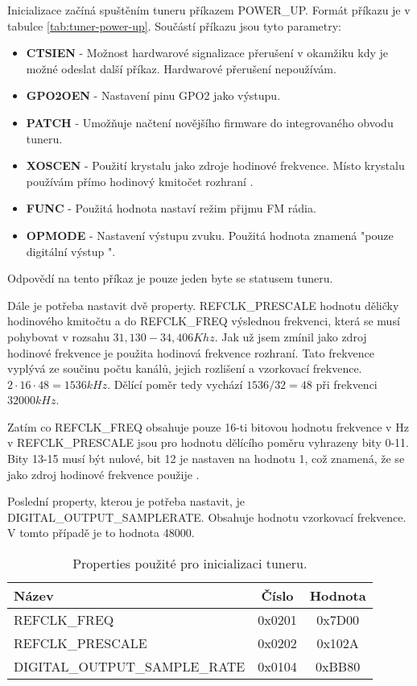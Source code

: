 Inicializace začíná spuštěním tuneru příkazem POWER\_UP. Formát příkazu je v tabulce \ref{tab:tuner-power-up}. Součástí příkazu jsou tyto parametry:

\begin{itemize}
\item \textbf{CTSIEN} - Možnost hardwarové signalizace přerušení v okamžiku kdy je možné odeslat další příkaz. Hardwarové přerušení nepoužívám.
\item \textbf{GPO2OEN} - Nastavení pinu GPO2 jako výstupu.
\item \textbf{PATCH} - Umožňuje načtení novějšího firmware do integrovaného obvodu tuneru.
\item \textbf{XOSCEN} - Použití krystalu jako zdroje hodinové frekvence. Místo krystalu používám přímo hodinový kmitočet rozhraní \iis.
\item \textbf{FUNC} - Použitá hodnota nastaví režim přijmu FM rádia.
\item \textbf{OPMODE} - Nastavení výstupu zvuku. Použitá hodnota znamená "pouze digitální výstup \iis".
\end{itemize}

Odpovědí na tento příkaz je pouze jeden byte se statusem tuneru.

Dále je potřeba nastavit dvě property. REFCLK\_PRESCALE hodnotu děličky hodinového kmitočtu a do REFCLK\_FREQ výslednou frekvenci, která se musí pohybovat v rozsahu $ 31,130 - 34,406 Khz $. Jak už jsem zmínil jako zdroj hodinové frekvence je použita hodinová frekvence \iis rozhraní. Tato frekvence vyplývá ze součinu počtu kanálů, jejich rozlišení a vzorkovací frekvence. $ 2 \cdot 16 \cdot 48 = 1536 kHz $. Dělící poměr tedy vychází $ 1536 / 32 = 48 $ při frekvenci $ 32000 kHz $.

Zatím co REFCLK\_FREQ obsahuje pouze 16-ti bitovou hodnotu frekvence v Hz v REFCLK\_PRESCALE jsou pro hodnotu dělícího poměru vyhrazeny bity 0-11. Bity 13-15 musí být nulové, bit 12 je nastaven na hodnotu 1, což znamená, že se jako zdroj hodinové frekvence použije \iis.

Poslední property, kterou je potřeba nastavit, je DIGITAL\_OUTPUT\_SAMPLERATE. Obsahuje hodnotu vzorkovací frekvence. V tomto případě je to hodnota 48000.

\begin{table}[ht!]
\begin{center}
\begin{tabular}{|l|c|c|}
\hline 
Název & Číslo & Hodnota \\ 
\hline 
REFCLK\_FREQ & 0x0201 & 0x7D00 \\ 
\hline 
REFCLK\_PRESCALE & 0x0202 & 0x102A \\ 
\hline 
DIGITAL\_OUTPUT\_SAMPLE\_RATE & 0x0104 & 0xBB80 \\ 
\hline 
\end{tabular} 
\end{center}
\caption{Properties použité pro inicializaci tuneru.}
\label{tab:tuner-init-prop} 
\end{table}

